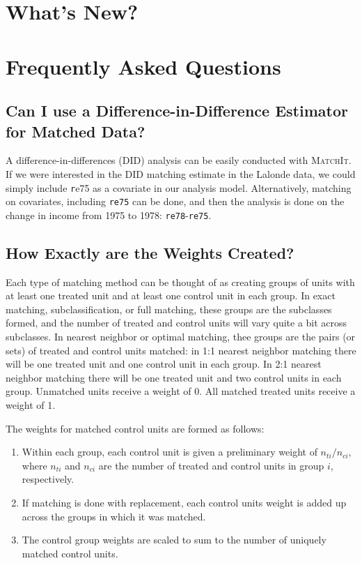 \documentclass[oneside,letterpaper,titlepage]{article}
\newcommand{\MatchIt}{\textsc{MatchIt}}
\begin{document}
\clearpage
\section{What's New?}

\clearpage

\section{Frequently Asked Questions}

\subsection{Can I use a Difference-in-Difference Estimator for Matched
  Data?}

A difference-in-differences (DID) analysis can be easily conducted
with \MatchIt.  If we were interested in the DID matching estimate in
the Lalonde data, we could simply include {\texttt re75} as a
covariate in our analysis model.  Alternatively, matching on
covariates, including {\tt re75} can be done, and then the analysis is
done on the change in income from 1975 to 1978: {\tt re78}-{\tt re75}.

\subsection{How Exactly are the Weights Created?}
\label{subsec:weights}

Each type of matching method can be thought of as creating groups of
units with at least one treated unit and at least one control unit in
each group.  In exact matching, subclassification, or full matching,
these groups are the subclasses formed, and the number of treated and
control units will vary quite a bit across subclasses.  In nearest
neighbor or optimal matching, thee groups are the pairs (or sets) of
treated and control units matched: in 1:1 nearest neighbor matching
there will be one treated unit and one control unit in each group.  In
2:1 nearest neighbor matching there will be one treated unit and two
control units in each group.  Unmatched units receive a weight of 0.
All matched treated units receive a weight of 1.

The weights for matched control units are formed as follows:
\begin{enumerate}
\item Within each group, each control unit is given a preliminary
  weight of $n_{ti}/n_{ci}$, where $n_{ti}$ and $n_{ci}$ are the
  number of treated and control units in group $i$, respectively.
\item If matching is done with replacement, each control units weight
  is added up across the groups in which it was matched.
\item The control group weights are scaled to sum to the number of
  uniquely matched control units.
\end{enumerate}
\end{document}
